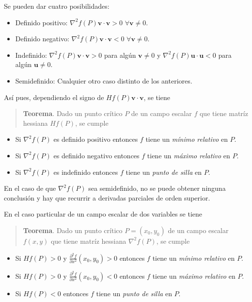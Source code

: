 \documentclass[
  a4paper,
]{scrreport}
\providecommand{\tightlist}{%
  \setlength{\itemsep}{0pt}\setlength{\parskip}{0pt}}\usepackage{longtable,booktabs,array}
\theoremstyle{plain}
\theoremstyle{plain}
\theoremstyle{definition}
\theoremstyle{definition}
\theoremstyle{plain}
\theoremstyle{definition}
\theoremstyle{remark}
\begin{document}
Se pueden dar cuatro posibilidades:

\begin{itemize}
\tightlist
\item
  Definido positivo: \(\nabla^2f(P)\mathbf{v}\cdot\mathbf{v}>0\)
  \(\forall \mathbf{v}\neq 0\).
\item
  Definido negativo: \(\nabla^2f(P)\mathbf{v}\cdot\mathbf{v}<0\)
  \(\forall \mathbf{v}\neq 0\).
\item
  Indefinido: \(\nabla^2f(P)\mathbf{v}\cdot\mathbf{v}>0\) para algún
  \(\mathbf{v}\neq 0\) y \(\nabla^2f(P)\mathbf{u}\cdot\mathbf{u}<0\)
  para algún \(\mathbf{u}\neq 0\).
\item
  Semidefinido: Cualquier otro caso distinto de los anteriores.
\end{itemize}

Así pues, dependiendo el signo de \(Hf(P)\mathbf{v}\cdot\mathbf{v}\), se
tiene

\begin{quote}
\textbf{Teorema}. Dado un punto crítico \(P\) de un campo escalar \(f\)
que tiene matríz hessiana \(Hf(P)\), se cumple
\end{quote}

\begin{itemize}
\tightlist
\item
  Si \(\nabla^2f(P)\) es definido positivo entonces \(f\) tiene un
  \emph{mínimo relativo} en \(P\).
\item
  Si \(\nabla^2f(P)\) es definido negativo entonces \(f\) tiene un
  \emph{máximo relativo} en \(P\).
\item
  Si \(\nabla^2f(P)\) es indefinido entonces \(f\) tiene un \emph{punto
  de silla} en \(P\).
\end{itemize}

En el caso de que \(\nabla^2f(P)\) sea semidefinido, no se puede obtener
ninguna conclusión y hay que recurrir a derivadas parciales de orden
superior.

En el caso particular de un campo escalar de dos variables se tiene

\begin{quote}
\textbf{Teorema}. Dado un punto crítico \(P=(x_0,y_0)\) de un campo
escalar \(f(x,y)\) que tiene matríz hessiana \(\nabla^2f(P)\), se cumple
\end{quote}

\begin{itemize}
\tightlist
\item
  Si \(Hf(P)>0\) y \(\frac{\partial^2 f}{\partial x^2}(x_0,y_0)>0\)
  entonces \(f\) tiene un \emph{mínimo relativo} en \(P\).
\item
  Si \(Hf(P)>0\) y \(\frac{\partial^2 f}{\partial x^2}(x_0,y_0)<0\)
  entonces \(f\) tiene un \emph{máximo relativo} en \(P\).
\item
  Si \(Hf(P)<0\) entonces \(f\) tiene un \emph{punto de silla} en \(P\).
\end{itemize}
\end{document}
